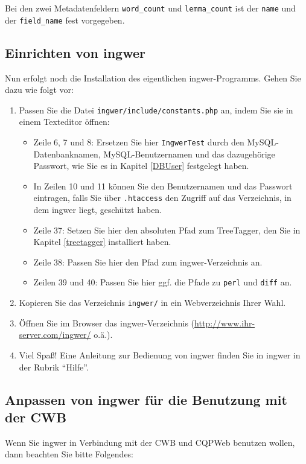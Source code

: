 \documentclass[11pt]{scrartcl} %
\begin{document}
Bei den zwei Metadatenfeldern \texttt{word\_count} und \texttt{lemma\_count} ist der \texttt{name} und der \texttt{field\_name} fest vorgegeben.

\subsection{Einrichten von ingwer}

Nun erfolgt noch die Installation des eigentlichen ingwer-Programms. Gehen Sie dazu wie folgt vor:

\begin{enumerate}
\item Passen Sie die Datei \texttt{ingwer/include/constants.php} an, indem Sie sie in einem Texteditor \"offnen:
\begin{itemize}
\item Zeile 6, 7 und 8: Ersetzen Sie hier \texttt{IngwerTest} durch den MySQL-Datenbank\-namen, MySQL-Benutzernamen und das dazugeh\"orige Passwort, wie Sie es in Kapitel \ref{DBUser} festgelegt haben.
\item In Zeilen 10 und 11 k\"onnen Sie den Benutzernamen und das Passwort eintragen, falls Sie \"uber \texttt{.htaccess} den Zugriff auf das Verzeichnis, in dem ingwer liegt, gesch\"utzt haben.
\item Zeile 37: Setzen Sie hier den absoluten Pfad zum TreeTagger, den Sie in Kapitel \ref{treetagger} installiert haben.
\item Zeile 38: Passen Sie hier den Pfad zum ingwer-Verzeichnis an.
\item Zeilen 39 und 40: Passen Sie hier ggf. die Pfade zu \texttt{perl} und \texttt{diff} an.
\end{itemize}
\item Kopieren Sie das Verzeichnis \texttt{ingwer/} in ein Webverzeichnis Ihrer Wahl.
\item \"Offnen Sie im Browser das ingwer-Verzeichnis (\url{http://www.ihr-server.com/ingwer/} o.\"a.).
\item Viel Spa{\ss}! Eine Anleitung zur Bedienung von ingwer finden Sie in ingwer in der Rubrik \enquote{Hilfe}.
\end{enumerate}

\subsection{Anpassen von ingwer f\"ur die Benutzung mit der CWB}

Wenn Sie ingwer in Verbindung mit der CWB und CQPWeb benutzen wollen, dann beachten Sie bitte Folgendes:
\end{document}
